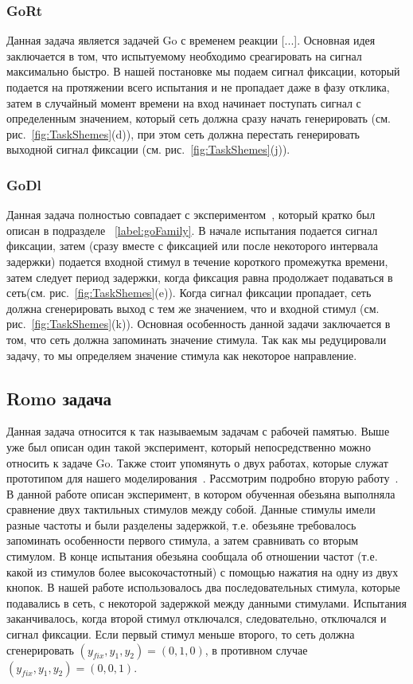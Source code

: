 \documentclass{article}
\begin{document}
\subsubsection{GoRt}\label{label:goRt}
Данная задача является задачей Go с временем реакции [...]. Основная идея заключается в том, что испытуемому необходимо среагировать на сигнал максимально быстро. В нашей постановке мы подаем сигнал фиксации, который подается на протяжении всего испытания и не пропадает даже в фазу отклика, затем в случайный момент времени на вход начинает поступать сигнал с определенным значением, который сеть должна сразу начать генерировать (см. рис.~\ref{fig:TaskShemes}(d)), при этом сеть должна перестать генерировать выходной сигнал фиксации (см. рис.~\ref{fig:TaskShemes}(j)).
\subsubsection{GoDl}
Данная задача полностью совпадает с экспериментом~\cite{funahashi1989mnemonic}, который кратко был описан в подразделе ~\ref{label:goFamily}. В начале испытания подается сигнал фиксации, затем (сразу вместе с фиксацией или после некоторого интервала задержки) подается входной стимул в течение короткого промежутка времени, затем следует период задержки, когда фиксация равна продолжает подаваться в сеть(см. рис.~\ref{fig:TaskShemes}(e)). Когда сигнал фиксации пропадает, сеть должна сгенерировать выход с тем же значением, что и входной стимул (см. рис.~\ref{fig:TaskShemes}(k)). Основная особенность данной задачи заключается в том, что сеть должна запоминать значение стимула. Так как мы редуцировали задачу, то мы определяем значение стимула как некоторое направление.

\subsection{Romo задача}

Данная задача относится к так называемым задачам с рабочей памятью. Выше уже был описан один такой эксперимент, который непосредственно можно относить к задаче Go. Также стоит упомянуть о двух работах, которые служат прототипом для нашего моделирования~\cite{zhang2019active,romo1999neuronal}. Рассмотрим подробно вторую работу~\cite{romo1999neuronal}. В данной работе описан эксперимент, в котором обученная обезьяна выполняла сравнение двух тактильных стимулов между собой. Данные стимулы имели разные частоты и были разделены задержкой, т.е. обезьяне требовалось запоминать особенности первого стимула, а затем сравнивать со вторым стимулом. В конце испытания обезьяна сообщала об отношении частот (т.е. какой из стимулов более высокочастотный) с помощью нажатия на одну из двух кнопок. В нашей работе использовалось два последовательных стимула, которые подавались в сеть, с некоторой задержкой между данными стимулами. Испытания заканчивалось, когда второй стимул отключался, следовательно, отключался и сигнал фиксации. Если первый стимул меньше второго, то сеть должна сгенерировать $(y_{fix}, y_1, y_2) = (0, 1, 0)$, в противном случае $(y_{fix}, y_1, y_2) = (0, 0, 1)$.
\end{document}
